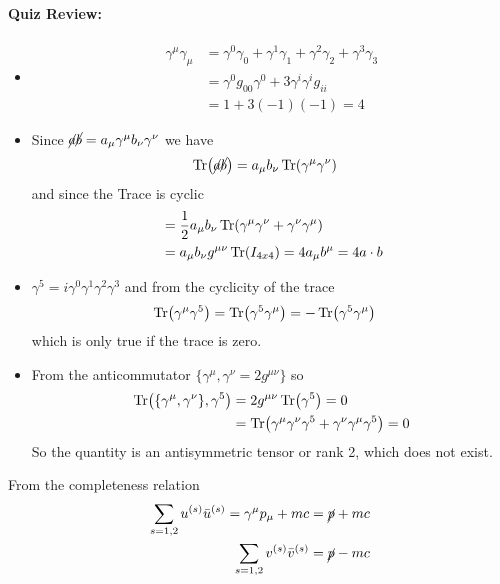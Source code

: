 \documentclass[../main.tex]{subfiles}
\begin{document}
\paragraph*{Quiz Review:}
\begin{itemize}
    \item \begin{align*}
        \gamma^\mu \gamma_\mu &= \gamma^0 \gamma_0 + \gamma^1 \gamma_1 + \gamma^2 \gamma_2 + \gamma^3 \gamma_3 \\
        &= \gamma^0 g_{00} \gamma^0 + 3 \gamma^i \gamma^i g_{ii} \\
        &= 1 + 3 (-1)(-1) = 4
    \end{align*}
    \item Since $\cancel{a} \cancel{b} = a_\mu \gamma^\mu b_\nu \gamma^\nu$ we have
    \begin{align*}
        \Tr (\cancel{a} \cancel{b})  &= a_\mu b_\nu \Tr(\gamma^\mu \gamma^\nu)
    \end{align*}
    and since the Trace is cyclic
    \begin{align*}
        &= \frac{1}{2} a_\mu b_\nu \Tr(\gamma^\mu \gamma^\nu + \gamma^\nu \gamma^\mu) \\
        &= a_\mu b_\nu g^{\mu\nu} \Tr(I_{4x4}) = 4 a_\mu b^\mu = 4 a \cdot b
    \end{align*}
    \item $\gamma^5 = i \gamma^0 \gamma^1 \gamma^2 \gamma^3$ and from the cyclicity of the trace
    \begin{align*}
        \Tr (\gamma^\mu \gamma^5) &= \Tr(\gamma^5 \gamma^\mu) = -\Tr(\gamma^5 \gamma^\mu)
    \end{align*}
    which is only true if the trace is zero.
    \item From the anticommutator $\{\gamma^\mu, \gamma^\nu = 2 g^{\mu\nu} \}$ so
    \begin{align*}
        \Tr(\{\gamma^\mu, \gamma^\nu\}, \gamma^5) &= 2 g^{\mu\nu} \Tr(\gamma^5) = 0 \\
        &= \Tr(\gamma^\mu \gamma^\nu \gamma^5 + \gamma^\nu \gamma^\mu \gamma^5) = 0
    \end{align*}
    So the quantity is an antisymmetric tensor or rank 2, which does not exist. 
\end{itemize}
From the completeness relation
\begin{align*}
    \sum_{s = 1,2} u^{(s)} \bar u^{(s)} = \gamma^\mu p_\mu + mc = \cancel{p} + mc \\
    \sum_{s = 1,2} v^{(s)} \bar v^{(s)} = \cancel{p} - mc
\end{align*}
\end{document}
